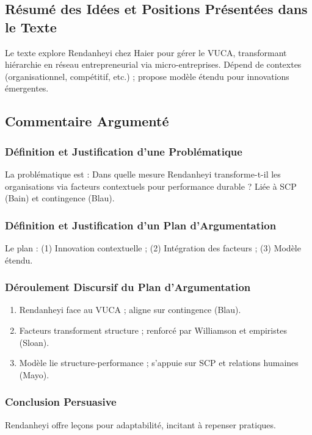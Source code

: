 \documentclass[11pt]{rapportECL}
\begin{document}
\subsection{Résumé des Idées et Positions Présentées dans le Texte}
Le texte explore Rendanheyi chez Haier pour gérer le VUCA, transformant hiérarchie en réseau entrepreneurial via micro-entreprises. Dépend de contextes (organisationnel, compétitif, etc.) ; propose modèle étendu pour innovations émergentes.

\subsection{Commentaire Argumenté}

\subsubsection{Définition et Justification d’une Problématique}
La problématique est : Dans quelle mesure Rendanheyi transforme-t-il les organisations via facteurs contextuels pour performance durable ? Liée à SCP (Bain) et contingence (Blau).

\subsubsection{Définition et Justification d’un Plan d’Argumentation}
Le plan : (1) Innovation contextuelle ; (2) Intégration des facteurs ; (3) Modèle étendu.

\subsubsection{Déroulement Discursif du Plan d’Argumentation}
\begin{enumerate}
\item Rendanheyi face au VUCA ; aligne sur contingence (Blau).
\item Facteurs transforment structure ; renforcé par Williamson et empiristes (Sloan).
\item Modèle lie structure-performance ; s’appuie sur SCP et relations humaines (Mayo).
\end{enumerate}

\subsubsection{Conclusion Persuasive}
Rendanheyi offre leçons pour adaptabilité, incitant à repenser pratiques.
\end{document}
